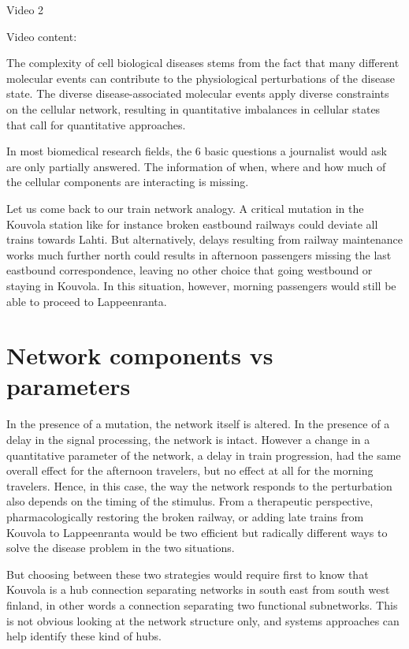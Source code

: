 \documentclass[
]{book}
\begin{document}
Video 2

Video content:

The complexity of cell biological diseases stems from the fact that many different molecular events can contribute to the physiological perturbations of the disease state. The diverse disease-associated molecular events apply diverse constraints on the cellular network, resulting in quantitative imbalances in cellular states that call for quantitative approaches.

In most biomedical research fields, the 6 basic questions a journalist would ask are only partially answered. The information of when, where and how much of the cellular components are interacting is missing.

Let us come back to our train network analogy. A critical mutation in the Kouvola station like for instance broken eastbound railways could deviate all trains towards Lahti. But alternatively, delays resulting from railway maintenance works much further north could results in afternoon passengers missing the last eastbound correspondence, leaving no other choice that going westbound or staying in Kouvola. In this situation, however, morning passengers would still be able to proceed to Lappeenranta.

\hypertarget{network-components-vs-parameters}{%
\section{Network components vs parameters}\label{network-components-vs-parameters}}

In the presence of a mutation, the network itself is altered. In the presence of a delay in the signal processing, the network is intact. However a change in a quantitative parameter of the network, a delay in train progression, had the same overall effect for the afternoon travelers, but no effect at all for the morning travelers. Hence, in this case, the way the network responds to the perturbation also depends on the timing of the stimulus. From a therapeutic perspective, pharmacologically restoring the broken railway, or adding late trains from Kouvola to Lappeenranta would be two efficient but radically different ways to solve the disease problem in the two situations.

But choosing between these two strategies would require first to know that Kouvola is a hub connection separating networks in south east from south west finland, in other words a connection separating two functional subnetworks. This is not obvious looking at the network structure only, and systems approaches can help identify these kind of hubs.
\end{document}
